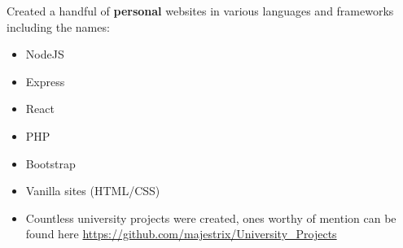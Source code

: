 \documentclass[10pt,a4paper,ragged2e]{altacv}
\begin{document}

 Created a handful of \textbf{personal} websites in various languages and frameworks including the names:
\begin{itemize}
\item NodeJS
\item Express
\item React
\item PHP
\item Bootstrap
\item Vanilla sites (HTML/CSS)
\end{itemize}

\divider

\begin{itemize}
\item  Countless university projects were created, ones worthy of mention can be found here \newline
\url{https://github.com/majestrix/University_Projects}
\end{itemize}
\divider

\clearpage
\end{document}
